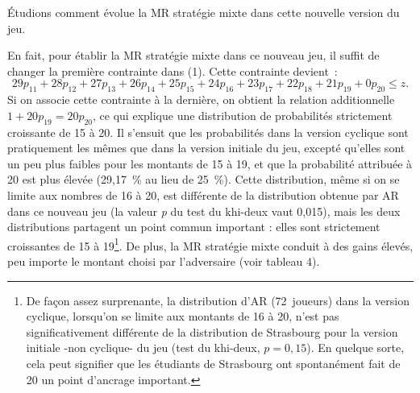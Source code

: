 \begin{Article}
\begin{refsection}[UmbhauerFR]
Étudions comment évolue la MR stratégie mixte dans cette nouvelle
version du jeu.

En fait, pour établir la MR stratégie mixte dans ce nouveau jeu, il
suffit de changer la première contrainte dans (1). Cette contrainte
devient~:
\[29p_{11} + 28p_{12} + 27p_{13} + 26p_{14} + 25p_{15} + 24p_{16} + 23p_{17} + 22p_{18} + 21p_{19} + 0p_{20} \leq z.\]
Si on associe cette contrainte à la dernière, on obtient la relation
additionnelle \(1 + 20p_{19} = 20p_{20}\), ce qui explique une
distribution de probabilités strictement croissante de 15 à 20. Il
s'ensuit que les probabilités dans la version cyclique sont pratiquement
les mêmes que dans la version initiale du jeu, excepté qu'elles sont un
peu plus faibles pour les montants de 15 à 19, et que la probabilité
attribuée à 20 est plus élevée (29,17~\% au lieu de 25~\%). Cette
distribution, même si on se limite aux nombres de 16 à 20, est
différente de la distribution obtenue par AR dans ce nouveau jeu (la
valeur \emph{p} du test du khi-deux vaut 0,015), mais les deux
distributions partagent un point commun important : elles sont
strictement croissantes de 15 à 19\footnote{De façon assez surprenante,
  la distribution d'AR (72~joueurs) dans la version cyclique, lorsqu'on
  se limite aux montants de 16 à 20, n'est pas significativement
  différente de la distribution de Strasbourg pour la version initiale
  -non cyclique- du jeu (test du khi-deux, \(p = 0,15\)). En quelque
  sorte, cela peut signifier que les étudiants de Strasbourg ont
  spontanément fait de 20 un point d'ancrage important.}. De plus, la MR
stratégie mixte conduit à des gains élevés, peu importe le montant
choisi par l'adversaire (voir tableau 4).

\begin{table}[h!]
\caption{Distribution expérimentale d'AR, minimax regret en
  stratégies mixtes, équilibre de Nash symétrique et paiement moyen du
  minimax regret dans la version cyclique d'AR}\label{tabl4}
\centering
{}
\end{table}


\end{refsection}
\end{Article}
